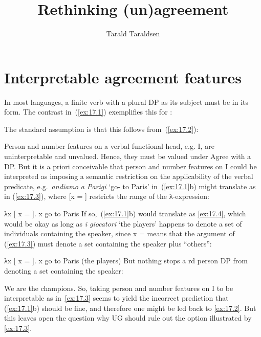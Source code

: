 \documentclass[output=paper]{langsci/langscibook}
\author{Tarald Taraldsen\affiliation{University of Tromsø \& Masaryk University}}
\title{Rethinking (un)agreement}
\begin{document}
\glsresetall
\maketitle

\section{Interpretable agreement features}\label{sec:17.1}

In most languages, a finite verb with a plural DP as its subject must be in its
\Tpl{} form. The contrast in~(\ref{ex:17.1}) exemplifies this for :

\ea\label{ex:17.1} 
    \ea[]{%
    \gll I giocatori vanno a Parigi.\\
        the players go-\Tpl{} to Paris\\
    \glt}
    \z
\z
The standard assumption is that this follows from~(\ref{ex:17.2}):

\ea\label{ex:17.2}
    \ea Person and number features on a verbal functional head, e.g. I, are
    uninterpretable and unvalued.
    \ex Hence, they must be valued under Agree with a DP.
    \z
\z
But it is a priori conceivable that person and number features on I could be
interpreted as imposing a semantic restriction on the applicability of the
verbal predicate, e.g.\ \emph{andiamo a Parigi} ‘go-\Fpl{} to Paris’
in~(\ref{ex:17.1}b) might translate as in (\ref{ex:17.3}), where [x = \Fpl{}]
restricts the range of the λ-expression:

\ea\label{ex:17.3}
    λx [ x = \Fpl{}]. x go to Paris
\z
If so,~(\ref{ex:17.1}b) would translate as \eqref{ex:17.4}, which would be okay as long as
\emph{i giocatori} ‘the players’ happens to denote a set of individuals
containing the speaker, since x = \Fpl{} means that the argument of
(\ref{ex:17.3}) must denote a set containing the speaker plus “others”:

\ea\label{ex:17.4}
    λx [ x = \Fpl{}]. x go to Paris (the players)
\z
But nothing stops a \Third{}rd person DP from denoting a set containing the
speaker:

\ea\label{ex:17.5}
    We are the champions.
\z
So, taking person and number features on I to be interpretable as
in~\eqref{ex:17.3} seems to yield the incorrect prediction that
(\ref{ex:17.1}b) should be fine, and therefore one might be led back to
\eqref{ex:17.2}. But this leaves open the question why UG should rule out
the option illustrated by \eqref{ex:17.3}.
\end{document}
